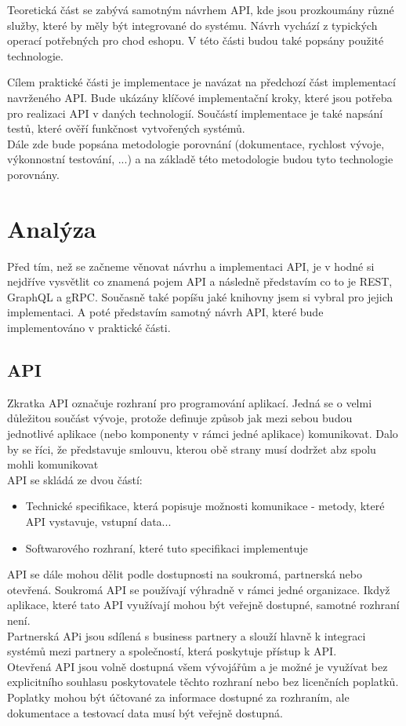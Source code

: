 \documentclass[thesis=M,czech]{FITthesis}[2019/12/23]
\begin{document}
Teoretická část se zabývá samotným návrhem API, kde jsou prozkoumány různé služby, které by měly být integrované do systému. Návrh vychází z typických operací potřebných pro chod eshopu. V této části budou také popsány použité technologie.

Cílem praktické části je implementace je navázat na předchozí část implementací navrženého API. Bude ukázány klíčové implementační kroky, které jsou potřeba pro realizaci API v daných technologií. Součástí implementace je také napsání testů, které ověří funkčnost vytvořených systémů.\\
Dále zde bude popsána metodologie porovnání (dokumentace, rychlost vývoje, výkonnostní testování, ...) a na základě této metodologie budou tyto technologie porovnány.



\chapter{Analýza}
Před tím, než se začneme věnovat návrhu a implementaci API, je v hodné si nejdříve vysvětlit co znamená pojem API a následně představím co to je REST, GraphQL a gRPC. Současně také popíšu jaké knihovny jsem si vybral pro jejich implementaci. A poté představím samotný návrh API, které bude implementováno v praktické části.

\section{API}
Zkratka API označuje rozhraní pro programování aplikací. Jedná se o velmi důležitou součást vývoje, protože definuje způsob jak mezi sebou budou jednotlivé aplikace (nebo komponenty v rámci jedné aplikace) komunikovat. Dalo by se říci, že představuje smlouvu, kterou obě strany musí dodržet abz spolu mohli komunikovat\\
API se skládá ze dvou částí: 
\begin{itemize}
    \item Technické specifikace, která popisuje možnosti komunikace - metody, které API vystavuje, vstupní data...
    \item Softwarového rozhraní, které tuto specifikaci implementuje
\end{itemize}

API se dále mohou dělit podle dostupnosti na soukromá, partnerská nebo otevřená. Soukromá API se používají výhradně v rámci jedné organizace. Ikdyž aplikace, které tato API využívají mohou být veřejně dostupné, samotné rozhraní není.\\
Partnerská APi jsou sdílená s business partnery a slouží hlavně k integraci systémů mezi partnery a společností, která poskytuje přístup k API.\\
Otevřená API jsou volně dostupná všem vývojářům a je možné je využívat bez explicitního souhlasu poskytovatele těchto rozhraní nebo bez licenčních poplatků. Poplatky mohou být účtované za informace dostupné za rozhraním, ale dokumentace  a testovací data musí být veřejně dostupná.
\end{document}
